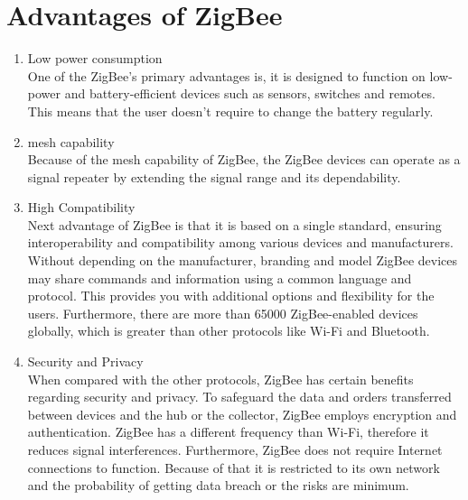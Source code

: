 \documentclass[conference]{IEEEtran}
\begin{document}
\section{Advantages of ZigBee}
\begin{enumerate}
  \item Low power consumption\\ One of the ZigBee’s primary advantages is, it is designed to function on low-power and battery-efficient devices such as sensors, switches and remotes. This means that the user doesn't require to change the battery regularly. \cite{polytechnichub}
\item mesh capability \\ Because of the mesh capability of ZigBee, the ZigBee devices can operate as a signal repeater by extending the signal range and its dependability. \cite{polytechnichub}
  \item High Compatibility\\Next advantage of ZigBee is that it is based on a single standard, ensuring interoperability and compatibility among various devices and manufacturers. Without depending on the manufacturer, branding and model ZigBee devices may share commands and information using a common language and protocol. This provides you with additional options and flexibility for the users.  Furthermore, there are more than 65000 ZigBee-enabled devices globally, which is greater than other protocols like Wi-Fi and Bluetooth.  \cite{polytechnichub}
  \item Security and Privacy\\ When compared with the other protocols, ZigBee has certain benefits regarding security and privacy. To safeguard the data and orders transferred between devices and the hub or the collector, ZigBee employs encryption and authentication. ZigBee has a different frequency than Wi-Fi, therefore it reduces signal interferences. Furthermore, ZigBee does not require Internet connections to function. Because of that it is restricted to its own network and the probability of getting data breach or the risks are minimum. \cite{polytechnichub}
\end{enumerate}
\end{document}
